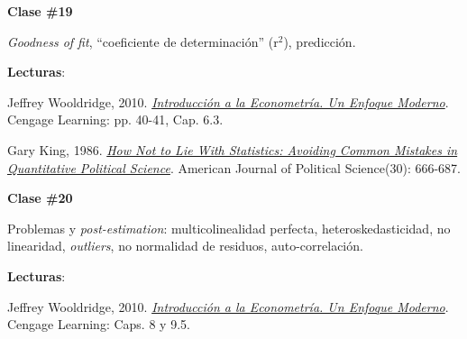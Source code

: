 \documentclass[letterpaper]{article}
\renewenvironment{itemize}{
  \begin{list}{}{
    \setlength{\leftmargin}{1.5em}
  }
}{
  \end{list}
}
\begin{document}
\begin{enumerate}
			\begin{itemize} 
				\item[$\bullet$] {\bf Clase \#19}
					\begin{itemize} 
						\item[$\circ$] \emph{Goodness of fit}, ``coeficiente de determinaci\'on'' (r$^2$), predicci\'on. 
						\item[$\circ$] {\bf Lecturas}:
							\begin{itemize} 
								\item[$\diamond$] Jeffrey Wooldridge, 2010. \href{https://github.com/hbahamonde/Metodos_Cuanti_I/raw/master/Readings/Wooldridge.pdf}{\emph{Introducci\'on a la Econometr\'ia. Un Enfoque Moderno}}. Cengage Learning: pp. 40-41, Cap. 6.3.
								\item[$\diamond$] Gary King, 1986. \href{https://github.com/hbahamonde/Metodos_Cuanti_I/raw/master/Readings/King.pdf}{\emph{How Not to Lie With Statistics: Avoiding Common Mistakes in Quantitative Political Science}}. American Journal of Political Science(30): 666-687.

							\end{itemize}
					\end{itemize}
			\end{itemize}







			\begin{itemize} 
				\item[$\bullet$] {\bf Clase \#20}
					\begin{itemize} 
						\item[$\circ$] Problemas y \emph{post-estimation}: multicolinealidad perfecta, heteroskedasticidad, no linearidad, \emph{outliers}, no normalidad de residuos, auto-correlaci\'on. %
						\item[$\circ$] {\bf Lecturas}: 
						\begin{itemize}
						\item[$\diamond$] Jeffrey Wooldridge, 2010. \href{https://github.com/hbahamonde/Metodos_Cuanti_I/raw/master/Readings/Wooldridge.pdf}{\emph{Introducci\'on a la Econometr\'ia. Un Enfoque Moderno}}. Cengage Learning: Caps. 8 y 9.5.
						\end{itemize}
					\end{itemize}
			\end{itemize}




\end{enumerate}
\end{document}
